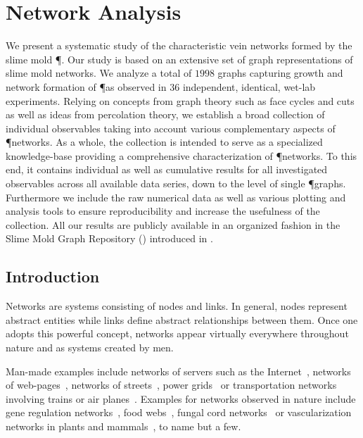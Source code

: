 \chapter{Network Analysis}\label{chap:analysis}

	We present a systematic study of the characteristic vein networks formed by the slime mold \P. Our study is based on an extensive set of graph representations of slime mold networks. We analyze a total of $1998$ graphs capturing growth and network formation of \P as observed in $36$ independent, identical, wet-lab experiments. Relying on concepts from graph theory such as face cycles and cuts as well as ideas from percolation theory, we establish a broad collection of individual observables taking into account various complementary aspects of \P networks. As a whole, the collection is intended to serve as a specialized knowledge-base providing a comprehensive characterization of \P networks. To this end, it contains individual as well as cumulative results for all investigated observables across all available data series, down to the level of single \P graphs. Furthermore we include the raw numerical data as well as various plotting and analysis tools to ensure reproducibility and increase the usefulness of the collection. All our results are publicly available in an organized fashion in the Slime Mold Graph Repository (\SMGR) introduced in .

\section{Introduction}		

	Networks are systems consisting of nodes and links. In general, nodes represent abstract entities while links define abstract relationships between them. Once one adopts this powerful concept, networks appear virtually everywhere throughout nature and as systems created by men.

	Man-made examples include networks of servers such as the Internet~\cite{faloutsos1999power,karagiannis2004long,huberman1999internet}, networks of web-pages~\cite{adamic2000power}, networks of streets~\cite{jiang2004topological,buhl2006topological}, power grids~\cite{rohden2012self,zhongwei2004comparison} or transportation networks involving trains or air planes~\cite{barrat2004weighted,guimera2004modeling,sienkiewicz2005statistical,sen2003small}. Examples for networks observed in nature include gene regulation networks~\cite{alon1999robustness,milo2002network}, food webs~\cite{pimm1991food,montoya2006ecological}, fungal cord networks~\cite{fricker2007network,heaton2012analysis} or vascularization networks in plants and mammals~\cite{katifori2010damage,roth2001evolution,koizumi2000series}, to name but a few. 

